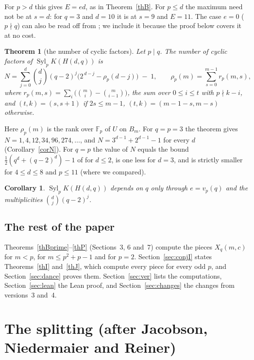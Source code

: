 \documentclass[10pt]{article}
\theoremstyle{ds}
\newtheorem{theorem}{Theorem}
\newtheorem{corollary}[lemma]{Corollary}
\theoremstyle{dsrem}
\newcommand{\F}{\mathbb{F}}
\newcommand{\Syl}{\operatorname{Syl}}
\begin{document}
For $p>d$ this gives $E=ed$, as in Theorem~\ref{thB}. For $p\le d$ the maximum need not be at $s=d$: for $q=3$ and $d=10$ it is at $s=9$ and $E=11$. The case $e=0$ ($p\nmid q$) can also be read off from \cite[Theorem~2]{JNR}; we include it because the proof below covers it at no cost.

\begin{theorem}[the number of cyclic factors]\label{thD}
Let $p\mid q$. The number of cyclic factors of $\Syl_p K(H(d,q))$ is
\[
N=\sum_{j=0}^{d}\binom dj(q-2)^j\Big(2^{\,d-j}-\rho_p(d-j)\Big)\;-\;1,\qquad \rho_p(m)=\sum_{s=0}^{m-1}r_p(m,s),
\]
where $r_p(m,s)=\sum_{i}\big(\binom mi-\binom m{i-1}\big)$, the sum over $0\le i\le t$ with $p\nmid k-i$, and $(t,k)=(s,s+1)$ if $2s\le m-1$, $(t,k)=(m-1-s,m-s)$ otherwise.
\end{theorem}

Here $\rho_p(m)$ is the rank over $\F_p$ of $U$ on $B_m$. For $q=p=3$ the theorem gives $N=1,4,12,34,96,274,\dots$, and $N=3^{d-1}+2^{d-1}-1$ for every $d$ (Corollary~\ref{corN}). For $q=p$ the value of $N$ equals the bound $\frac12(q^d+(q-2)^d)-1$ of \cite[Theorem~3]{JNR} for $d\le2$, is one less for $d=3$, and is strictly smaller for $4\le d\le8$ and $p\le11$ (where we compared).

\begin{corollary}\label{corq}
$\Syl_p K(H(d,q))$ depends on $q$ only through $e=v_p(q)$ and the multiplicities $\binom dj(q-2)^j$.
\end{corollary}

\subsection{The rest of the paper}
Theorems~\ref{thBprime}--\ref{thP} (Sections~3, 6 and~7) compute the pieces $X_q(m,c)$ for $m<p$, for $m\le p^2+p-1$ and for $p=2$. Section~\ref{sec:conjI} states Theorems~\ref{thI} and~\ref{thJ}, which compute every piece for every odd $p$, and Section~\ref{sec:dance} proves them. Section~\ref{sec:ver} lists the computations, Section~\ref{sec:lean} the Lean proof, and Section~\ref{sec:changes} the changes from versions~3 and~4.

\section{The splitting (after Jacobson, Niedermaier and Reiner)}
\end{document}
